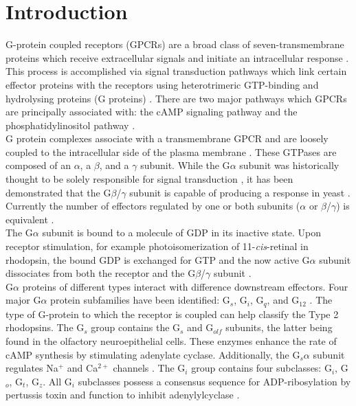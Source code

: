 \section{Introduction}
\indent G-protein coupled receptors (GPCRs) are a broad class of seven-transmembrane 
proteins which receive extracellular signals and initiate an intracellular response 
\cite{Lagerstrom2008}. This process is accomplished via signal transduction pathways 
which link certain effector proteins with the receptors using heterotrimeric GTP-binding 
and hydrolysing proteins (G proteins) \cite{Hepler1992}. There are two major pathways 
which GPCRs are principally associated with: the cAMP signaling pathway and the phosphatidylinositol pathway \cite{Gilman1987}.\\
\indent G protein complexes associate with a transmembrane GPCR and are loosely coupled to 
the intracellular side of the plasma membrane \cite{Clapham1997}.
These GTPases are composed of an $\alpha$, a $\beta$, and a $\gamma$ subunit. While the G$\alpha$ subunit 
was historically thought to be solely responsible for signal transduction \cite{Gilman1987}, 
it has been demonstrated that the G$\beta$/$\gamma$ subunit is capable of producing a 
response in yeast \cite{Clark1993}. Currently the number of effectors regulated by one 
or both subunits ($\alpha$ or $\beta$/$\gamma$) is equivalent \cite{Clapham1997}.\\ 
\indent The G$\alpha$ subunit is bound to a molecule of GDP in its inactive state. 
Upon receptor stimulation, for example photoisomerization of 11-\textit{cis}-retinal 
in rhodopsin, the bound GDP is exchanged for GTP and the now active G$\alpha$ subunit 
dissociates from both the receptor and the G$\beta$/$\gamma$ subunit \cite{Neves2002}.\\ 
\indent G$\alpha$ proteins of different types interact with difference downstream effectors. Four 
major G$\alpha$ protein subfamilies have been identified: G$_{s}$, G$_{i}$, G$_{q}$, and G$_{12}$ 
\cite{Hepler1992}. The type of G-protein to which the receptor is coupled can help classify the Type 2 
rhodopsins. The G$_{s}$ group contains the G$_{s}$ and G$_{olf}$  subunits, the latter being found 
in the olfactory neuroepithelial cells. These enzymes enhance the rate of cAMP synthesis by 
stimulating adenylate cyclase. Additionally, the G$_{s}\alpha$ subunit regulates Na$^{+}$ and 
Ca$^{2+}$ channels \cite{Hepler1992}. The G$_{i}$ group contains four subclasses: G$_{i}$, 
G$_{o}$, G$_{t}$, G$_{z}$. All G$_{i}$ subclasses possess a consensus sequence for 
ADP-ribosylation by pertussis toxin and function to inhibit adenylylcyclase \cite{KABMycotaIII}. 
